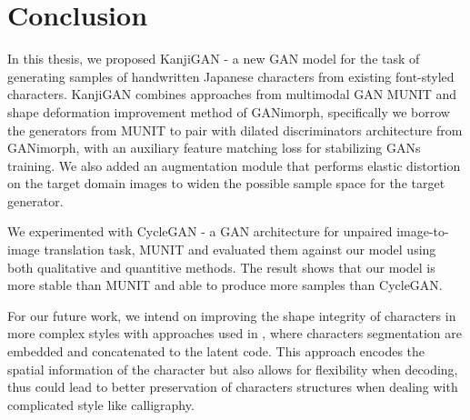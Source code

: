\documentclass[12pt]{report}
\begin{document}
\chapter{Conclusion}
\label{chap:conclusion}

In this thesis, we proposed KanjiGAN - a new GAN model for the task of generating samples of handwritten Japanese characters from existing font-styled characters. KanjiGAN combines approaches from multimodal GAN MUNIT\cite{munit} and shape deformation improvement method of GANimorph\cite{ganimorph}, specifically we borrow the generators from MUNIT to pair with dilated discriminators architecture from GANimorph, with an auxiliary feature matching loss for stabilizing GANs training. We also added an augmentation module that performs elastic distortion on the target domain images to widen the possible sample space for the target generator.

We experimented with CycleGAN - a GAN architecture for unpaired image-to-image translation task, MUNIT and evaluated them against our model using both qualitative and quantitive methods. The result shows that our model is more stable than MUNIT and able to produce more samples than CycleGAN.

For our future work, we intend on improving the shape integrity of characters in more complex styles with approaches used in \cite{dense-ran}\cite{calligan}, where characters segmentation are embedded and concatenated to the latent code. This approach encodes the spatial information of the character but also allows for flexibility when decoding, thus could lead to better preservation of characters structures when dealing with complicated style like calligraphy. 
\end{document}
